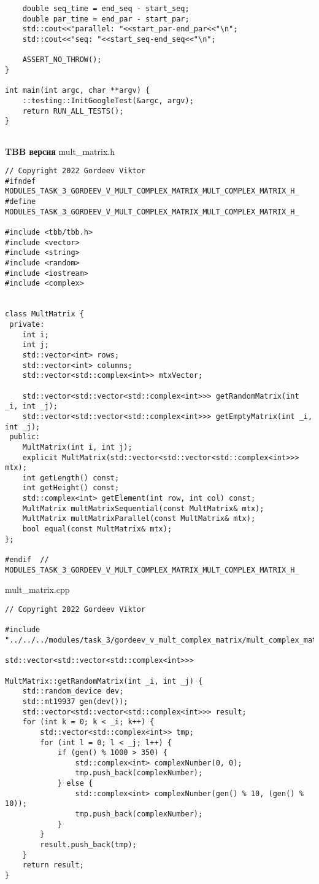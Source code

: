 \documentclass{report}
\begin{document}
\begin{enumerate}
\begin{lstlisting}
    double seq_time = end_seq - start_seq;
    double par_time = end_par - start_par;
    std::cout<<"parallel: "<<start_par-end_par<<"\n";
    std::cout<<"seq: "<<start_seq-end_seq<<"\n";

    ASSERT_NO_THROW();
}

int main(int argc, char **argv) {
    ::testing::InitGoogleTest(&argc, argv);
    return RUN_ALL_TESTS();
}


\end{lstlisting}

\textbf{TBB версия}
\newline
\newline mult_matrix.h
\begin{lstlisting}
// Copyright 2022 Gordeev Viktor
#ifndef MODULES_TASK_3_GORDEEV_V_MULT_COMPLEX_MATRIX_MULT_COMPLEX_MATRIX_H_
#define MODULES_TASK_3_GORDEEV_V_MULT_COMPLEX_MATRIX_MULT_COMPLEX_MATRIX_H_

#include <tbb/tbb.h>
#include <vector>
#include <string>
#include <random>
#include <iostream>
#include <complex>


class MultMatrix {
 private:
    int i;
    int j;
    std::vector<int> rows;
    std::vector<int> columns;
    std::vector<std::complex<int>> mtxVector;

    std::vector<std::vector<std::complex<int>>> getRandomMatrix(int _i, int _j);
    std::vector<std::vector<std::complex<int>>> getEmptyMatrix(int _i, int _j);
 public:
    MultMatrix(int i, int j);
    explicit MultMatrix(std::vector<std::vector<std::complex<int>>> mtx);
    int getLength() const;
    int getHeight() const;
    std::complex<int> getElement(int row, int col) const;
    MultMatrix multMatrixSequential(const MultMatrix& mtx);
    MultMatrix multMatrixParallel(const MultMatrix& mtx);
    bool equal(const MultMatrix& mtx);
};

#endif  // MODULES_TASK_3_GORDEEV_V_MULT_COMPLEX_MATRIX_MULT_COMPLEX_MATRIX_H_

\end{lstlisting}
mult_matrix.cpp
\begin{lstlisting}
// Copyright 2022 Gordeev Viktor

#include "../../../modules/task_3/gordeev_v_mult_complex_matrix/mult_complex_matrix.h"

std::vector<std::vector<std::complex<int>>>

MultMatrix::getRandomMatrix(int _i, int _j) {
    std::random_device dev;
    std::mt19937 gen(dev());
    std::vector<std::vector<std::complex<int>>> result;
    for (int k = 0; k < _i; k++) {
        std::vector<std::complex<int>> tmp;
        for (int l = 0; l < _j; l++) {
            if (gen() % 1000 > 350) {
                std::complex<int> complexNumber(0, 0);
                tmp.push_back(complexNumber);
            } else {
                std::complex<int> complexNumber(gen() % 10, (gen() % 10));
                tmp.push_back(complexNumber);
            }
        }
        result.push_back(tmp);
    }
    return result;
}


\end{lstlisting}
\end{enumerate}
\end{document}
